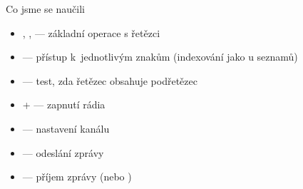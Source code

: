 \begin{frame}{Co jsme se naučili}
  \begin{itemize}
    \item[\checkmark] , ,  — základní operace s řetězci
    \item[\checkmark]  — přístup k~jednotlivým znakům (indexování jako u seznamů)
    \item[\checkmark]  — test, zda řetězec obsahuje podřetězec
    \item[\checkmark]  +  — zapnutí rádia
    \item[\checkmark]  — nastavení kanálu
    \item[\checkmark]  — odeslání zprávy
    \item[\checkmark]  — příjem zprávy (nebo )
  \end{itemize}
\end{frame}


